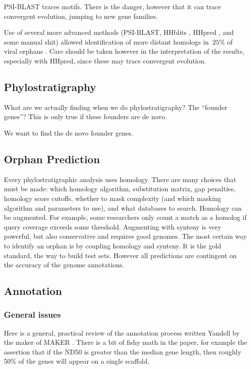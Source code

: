 PSI-BLAST traces motifs. There is the danger, however that it can trace
convergent evolution, jumping to new gene families. 

Use of several more advanced methods (PSI-BLAST, HHblits
\cite{remmert_hhblits:_2011}, HHpred \cite{hildebrand_fast_2009}, and some
manual shit) allowed identification of more distant homologs in $~25\%$ of
viral orphans \cite{kuchibhatla_powerful_2013}. Care should be taken however in
the interpretation of the results, especially with HHpred, since these may trace
convergent evolution.

\subsection{Phylostratigraphy}

What are we actually finding when we do phylostratigraphy? The ``founder
genes''? This is only true if these founders are de novo.

We want to find the de novo founder genes.

\subsection{Orphan Prediction}

Every phylostratigraphic analysis uses homology. There are many choices that
must be made: which homology algorithm, substitution matrix, gap penalties,
homology score cutoffs, whether to mask complexity (and which masking algorithm
and parameters to use), and what databases to search. Homology can be
augmented. For example, some researchers only count a match as a homolog if
query coverage exceeds some threshold. Augmenting with synteny is very
powerful, but also conservative and requires good genomes. The most certain way
to identify an orphan is by coupling homology and synteny. It is the gold
standard, the way to build test sets. However all predictions are contingent on
the accuracy of the genome annotations.

\subsection{Annotation}
\subsubsection{General issues}

  Here is a general, practical review of the annotation process written Yandell
  by the maker of MAKER \cite{yandell_beginners_2012}. There is a bit of fishy
  math in the paper, for example the assertion that if the ND50 is greater than
  the median gene length, then roughly 50\% of the genes will appear on a
  single scaffold.
  
